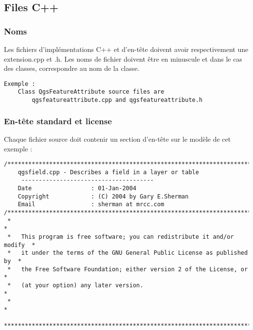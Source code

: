 \subsection{Files C++}
\subsubsection{Noms}
Les fichiers d'impl\'ementations C++ et d'en-t\^ete doivent avoir respectivement une extension.cpp et .h. Les noms de fichier doivent \^etre en minuscule et dans le cas des classes, correspondre au nom de la classe.

\begin{verbatim}
Exemple :
	Class QgsFeatureAttribute source files are 
		qgsfeatureattribute.cpp and qgsfeatureattribute.h
\end{verbatim}

\subsubsection{En-t\^ete standard et license}
Chaque fichier source doit contenir un section d'en-t\^ete sur le mod\`ele de cet exemple :

\begin{verbatim}
/***************************************************************************
    qgsfield.cpp - Describes a field in a layer or table
     --------------------------------------
    Date                 : 01-Jan-2004
    Copyright            : (C) 2004 by Gary E.Sherman
    Email                : sherman at mrcc.com
/***************************************************************************
 *                                                                         *
 *   This program is free software; you can redistribute it and/or modify  *
 *   it under the terms of the GNU General Public License as published by  *
 *   the Free Software Foundation; either version 2 of the License, or     *
 *   (at your option) any later version.                                   *
 *                                                                         *
 ***************************************************************************/
\end{verbatim}

